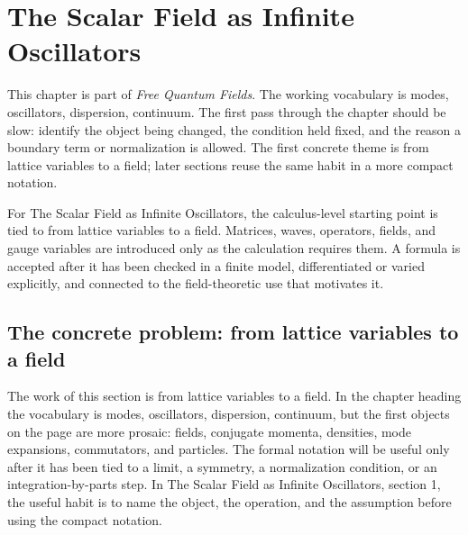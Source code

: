 \chapter{The Scalar Field as Infinite Oscillators}


This chapter is part of \emph{Free Quantum Fields}.  The working vocabulary is modes, oscillators, dispersion, continuum.  The first pass through the chapter should be slow: identify the object being changed, the condition held fixed, and the reason a boundary term or normalization is allowed.  The first concrete theme is from lattice variables to a field; later sections reuse the same habit in a more compact notation.

For The Scalar Field as Infinite Oscillators, the calculus-level starting point is tied to from lattice variables to a field.  Matrices, waves, operators, fields, and gauge variables are introduced only as the calculation requires them.  A formula is accepted after it has been checked in a finite model, differentiated or varied explicitly, and connected to the field-theoretic use that motivates it.

\section{The concrete problem: from lattice variables to a field}













The work of this section is from lattice variables to a field.  In the chapter heading the vocabulary is modes, oscillators, dispersion, continuum, but the first objects on the page are more prosaic: fields, conjugate momenta, densities, mode expansions, commutators, and particles.  The formal notation will be useful only after it has been tied to a limit, a symmetry, a normalization condition, or an integration-by-parts step.  In The Scalar Field as Infinite Oscillators, section 1, the useful habit is to name the object, the operation, and the assumption before using the compact notation.

